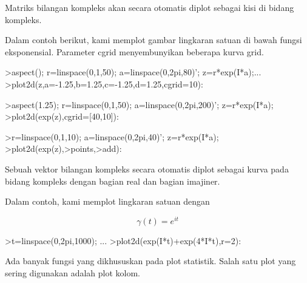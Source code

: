 \documentclass[a4paper,10pt]{article}
\begin{document}
\begin{eulernotebook}
\begin{eulercomment}
\begin{eulercomment}
\begin{eulercomment}
\begin{eulercomment}
\begin{eulercomment}
\begin{eulercomment}
\begin{eulercomment}
\begin{eulercomment}
\begin{eulercomment}
Matriks bilangan kompleks akan secara otomatis diplot sebagai kisi di
bidang kompleks.

Dalam contoh berikut, kami memplot gambar lingkaran satuan di bawah
fungsi eksponensial. Parameter cgrid menyembunyikan beberapa kurva
grid.
\end{eulercomment}
\begin{eulerprompt}
>aspect(); r=linspace(0,1,50); a=linspace(0,2pi,80)'; z=r*exp(I*a);...
>plot2d(z,a=-1.25,b=1.25,c=-1.25,d=1.25,cgrid=10):
\end{eulerprompt}
\begin{eulerprompt}
>aspect(1.25); r=linspace(0,1,50); a=linspace(0,2pi,200)'; z=r*exp(I*a);
>plot2d(exp(z),cgrid=[40,10]):
\end{eulerprompt}
\begin{eulerprompt}
>r=linspace(0,1,10); a=linspace(0,2pi,40)'; z=r*exp(I*a);
>plot2d(exp(z),>points,>add):
\end{eulerprompt}
\begin{eulercomment}
Sebuah vektor bilangan kompleks secara otomatis diplot sebagai kurva
pada bidang kompleks dengan bagian real dan bagian imajiner.

Dalam contoh, kami memplot lingkaran satuan dengan

\end{eulercomment}
\begin{eulerformula}
\[
\gamma(t) = e^{it}
\]
\end{eulerformula}
\begin{eulerprompt}
>t=linspace(0,2pi,1000); ...
>plot2d(exp(I*t)+exp(4*I*t),r=2):
\end{eulerprompt}
\begin{eulercomment}
Ada banyak fungsi yang dikhususkan pada plot statistik. Salah satu
plot yang sering digunakan adalah plot kolom.


\end{eulercomment}
\end{eulercomment}
\end{eulercomment}
\end{eulercomment}
\end{eulercomment}
\end{eulercomment}
\end{eulercomment}
\end{eulercomment}
\end{eulercomment}
\end{eulernotebook}
\end{document}
